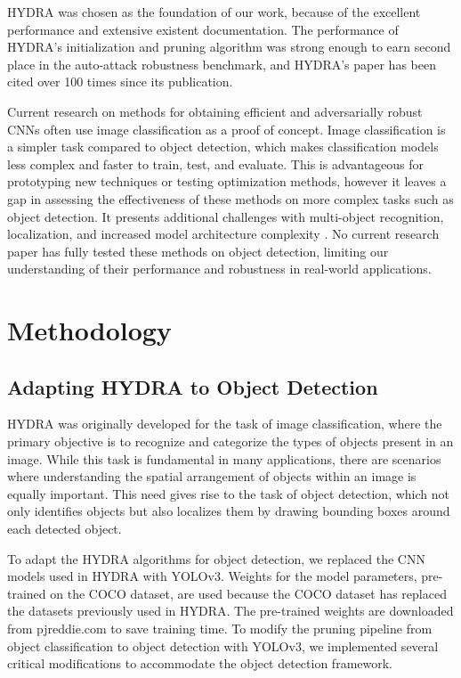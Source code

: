 \documentclass[journal,onecolumn,12pt]{IEEEtran}
\begin{document}
HYDRA was chosen as the foundation of our work, because of the excellent performance and extensive existent documentation. The performance of HYDRA's initialization and pruning algorithm was strong enough to earn second place in the auto-attack robustness benchmark, and HYDRA's paper has been cited over 100 times since its publication.

Current research on methods for obtaining efficient and adversarially robust CNNs often use image classification as a proof of concept. Image classification is a simpler task compared to object detection, which makes classification models less complex and faster to train, test, and evaluate. This is advantageous for prototyping new techniques or testing optimization methods, however it leaves a gap in assessing the effectiveness of these methods on more complex tasks such as object detection. It presents additional challenges with multi-object recognition, localization, and increased model architecture complexity \cite{10099639}. No current research paper has fully tested these methods on object detection, limiting our understanding of their performance and robustness in real-world applications.

\section{Methodology}

\subsection{Adapting HYDRA to Object Detection}
HYDRA was originally developed for the task of image classification, where the primary objective is to recognize and categorize the types of objects present in an image. While this task is fundamental in many applications, there are scenarios where understanding the spatial arrangement of objects within an image is equally important. This need gives rise to the task of object detection, which not only identifies objects but also localizes them by drawing bounding boxes around each detected object.

To adapt the HYDRA algorithms for object detection, we replaced the CNN models used in HYDRA with YOLOv3. Weights for the model parameters, pre-trained on the COCO dataset, are used because the COCO dataset has replaced the datasets previously used in HYDRA. The pre-trained weights are downloaded from pjreddie.com to save training time. To modify the pruning pipeline from object classification to object detection with YOLOv3, we implemented several critical modifications to accommodate the object detection framework. 
\end{document}
